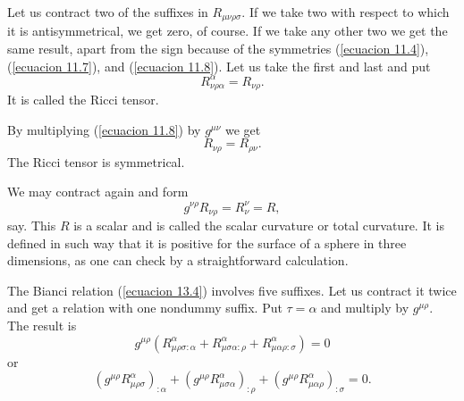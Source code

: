 Let us contract two of the suffixes in $R_{\mu\nu\rho\sigma}$. If we take two with respect to which it is 
antisymmetrical, we get zero, of course. If we take any other two we get the same result, apart from the sign because 
of the symmetries (\ref{ecuacion 11.4}), (\ref{ecuacion 11.7}), and (\ref{ecuacion 11.8}). Let us take the first and 
last and put
\[
R^{\alpha}_{\nu\rho\alpha} = R_{\nu\rho}.
\]
It is called the Ricci tensor.

By multiplying (\ref{ecuacion 11.8}) by $g^{\mu\nu}$ we get 
\begin{equation}
 \label{ecuacion 14.1}
 R_{\nu\rho} = R_{\rho\nu}.
\end{equation}
The Ricci tensor is symmetrical.

We may contract again and form
\[
g^{\nu\rho}R_{\nu\rho} = R^{\nu}_{\nu} = R,
\]
say. This $R$ is a scalar and is called the scalar curvature or total curvature. It is defined in such way that it is 
positive for the surface of a sphere in three dimensions, as one can check by a straightforward calculation.

The Bianci relation (\ref{ecuacion 13.4}) involves five suffixes. Let us contract it twice and get a relation with one 
nondummy suffix. Put $\tau = \alpha$ and multiply by $g^{\mu\rho}$. The result is
\[
g^{\mu\rho}\left(
R^{\alpha}_{\mu\rho\sigma:\alpha} +
R^{\alpha}_{\mu\sigma\alpha:\rho} +
R^{\alpha}_{\mu\alpha\rho:\sigma}
\right) = 0
\]
or
\begin{equation}
 \label{ecuacion 14.2}
 \left( g^{\mu\rho} R^{\alpha}_{\mu\rho\sigma}\right)_{:\alpha} +
 \left( g^{\mu\rho} R^{\alpha}_{\mu\sigma\alpha}\right)_{:\rho} +
 \left( g^{\mu\rho} R^{\alpha}_{\mu\alpha\rho}\right)_{:\sigma}
 = 0 .
\end{equation}

